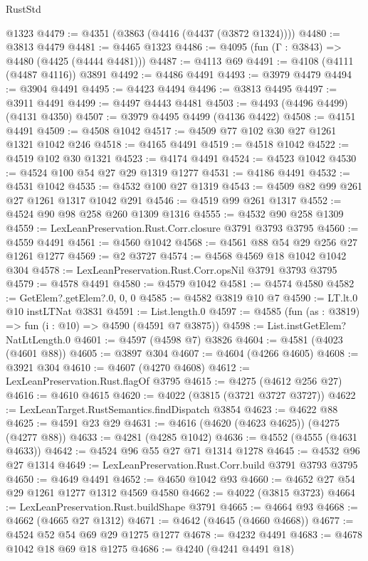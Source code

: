 \begin{lexlean}{RustStd}
\begin{coremodule}
{\begin{coremodule}
{{{{{{{{{{{{{{{{{{{{{{{{{{{{{{{{{{{    @1323
@4479 := @4351 (@3863 (@4416 (@4437 (@3872 @1324))))
@4480 := @3813 @4479
@4481 := @4465 @1323
@4486 := @4095 (fun (Γ : @3843) => @4480 (@4425 (@4444 @4481)))
@4487 := @4113 @69
@4491 := @4108 (@4111 (@4487 @4116)) @3891
@4492 := @4486 @4491
@4493 := @3979 @4479
@4494 := @3904 @4491
@4495 := @4423 @4494
@4496 := @3813 @4495
@4497 := @3911 @4491
@4499 := @4497 @4443 @4481
@4503 := @4493 (@4496 @4499) (@4131 @4350)
@4507 := @3979 @4495 @4499 (@4136 @4422)
@4508 := @4151 @4491
@4509 := @4508 @1042
@4517 := @4509 @77 @102 @30 @27 @1261 @1321 @1042 @246
@4518 := @4165 @4491
@4519 := @4518 @1042
@4522 := @4519 @102 @30 @1321
@4523 := @4174 @4491
@4524 := @4523 @1042
@4530 := @4524 @100 @54 @27 @29 @1319 @1277
@4531 := @4186 @4491
@4532 := @4531 @1042
@4535 := @4532 @100 @27 @1319
@4543 := @4509 @82 @99 @261 @27 @1261 @1317 @1042 @291
@4546 := @4519 @99 @261 @1317
@4552 := @4524 @90 @98 @258 @260 @1309 @1316
@4555 := @4532 @90 @258 @1309
@4559 := LexLeanPreservation.Rust.Corr.closure @3791 @3793 @3795
@4560 := @4559 @4491
@4561 := @4560 @1042
@4568 := @4561 @88 @54 @29 @256 @27 @1261 @1277
@4569 := @2 @3727
@4574 := @4568 @4569 @18 @1042 @1042 @304
@4578 := LexLeanPreservation.Rust.Corr.opsNil @3791 @3793 @3795
@4579 := @4578 @4491
@4580 := @4579 @1042
@4581 := @4574 @4580
@4582 := GetElem?.getElem?.{0, 0, 0}
@4585 := @4582 @3819 @10 @7
@4590 := LT.lt.{0} @10 instLTNat @3831
@4591 := List.length.{0}
@4597 := @4585 (fun (as : @3819) => fun (i : @10) => @4590 (@4591 @7 @3875))
@4598 := List.instGetElem?NatLtLength.{0}
@4601 := @4597 (@4598 @7) @3826
@4604 := @4581 (@4023 (@4601 @88))
@4605 := @3897 @304
@4607 := @4604 (@4266 @4605)
@4608 := @3921 @304
@4610 := @4607 (@4270 @4608)
@4612 := LexLeanPreservation.Rust.flagOf @3795
@4615 := @4275 (@4612 @256 @27)
@4616 := @4610 @4615
@4620 := @4022 (@3815 (@3721 @3727 @3727))
@4622 := LexLeanTarget.RustSemantics.findDispatch @3854
@4623 := @4622 @88
@4625 := @4591 @23 @29
@4631 := @4616 (@4620 (@4623 @4625)) (@4275 (@4277 @88))
@4633 := @4281 (@4285 @1042)
@4636 := @4552 (@4555 (@4631 @4633))
@4642 := @4524 @96 @55 @27 @71 @1314 @1278
@4645 := @4532 @96 @27 @1314
@4649 := LexLeanPreservation.Rust.Corr.build @3791 @3793 @3795
@4650 := @4649 @4491
@4652 := @4650 @1042 @93
@4660 := @4652 @27 @54 @29 @1261 @1277 @1312 @4569 @4580
@4662 := @4022 (@3815 @3723)
@4664 := LexLeanPreservation.Rust.buildShape @3791
@4665 := @4664 @93
@4668 := @4662 (@4665 @27 @1312)
@4671 := @4642 (@4645 (@4660 @4668))
@4677 := @4524 @52 @54 @69 @29 @1275 @1277
@4678 := @4232 @4491
@4683 := @4678 @1042 @18 @69 @18 @1275
@4686 := @4240 (@4241 @4491 @18)
}}}}}}}}}}}}}}}}}}}}}}}}}}}}}}}}}}}
\end{coremodule}}
\end{coremodule}
\end{lexlean}
